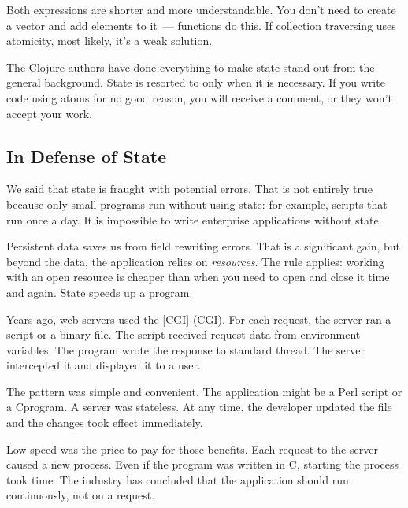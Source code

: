 \fi

Both expressions are shorter and more understandable. You don't need to create a vector and add elements to it~--- functions do this. If collection traversing uses atomicity, most likely, it's a weak solution.

The Clojure authors have done everything to make state stand out from the general background.
State is resorted to only when it is necessary.
If you write code using atoms for no good reason, you will receive a comment, or they won't accept your work.


\subsection{In Defense of State}

We said that state is fraught with potential errors. That is not entirely true because only small programs run without using state: for example, scripts that run once a day. It is impossible to write enterprise applications without state.


Persistent data saves us from field rewriting errors. That is a significant gain, but beyond the data, the application relies on \emph{resources}.
The rule applies: working with an open resource is cheaper than when you need to open and close it time and again.
State speeds up a program.


Years ago, web servers used the [CGI] (CGI).
For each request, the server ran a script or a binary file.
The script received request data from environment variables. The program wrote the response to standard thread. The server intercepted it and displayed it to a user.

The pattern was simple and convenient. The application might be a Perl script or a C\Plus\Plus program. A server was stateless. At any time, the developer updated the file and the changes took effect immediately.

Low speed was the price to pay for those benefits. Each request to the server caused a new process.
Even if the program was written in C, starting the process took time.
The industry has concluded that the application should run continuously, not on a request.


